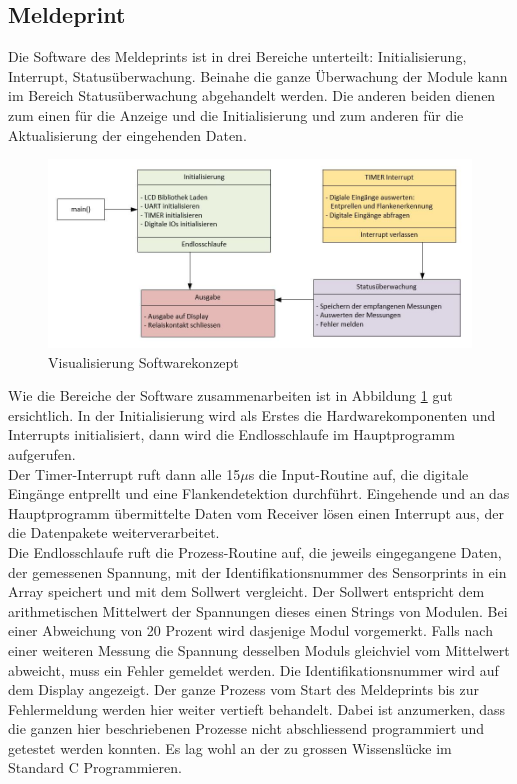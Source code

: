\subsection{Meldeprint}
Die Software des Meldeprints ist in drei Bereiche unterteilt: Initialisierung, Interrupt, Statusüberwachung. Beinahe die ganze Überwachung der Module kann im Bereich Statusüberwachung abgehandelt werden. Die anderen beiden dienen zum einen für die Anzeige und die Initialisierung und zum anderen für die Aktualisierung der eingehenden Daten.

\begin{figure}[htbp] 
  \centering
     \includegraphics[width=1\textwidth]{graphics/reportboard-software-river}
  \caption{Visualisierung Softwarekonzept}
  \label{fig:reportboard-software-river}
\end{figure}

Wie die Bereiche der Software zusammenarbeiten ist in Abbildung \ref{fig:reportboard-software-river} gut ersichtlich. In der Initialisierung wird als Erstes die Hardwarekomponenten und Interrupts initialisiert, dann wird die Endlosschlaufe im Hauptprogramm aufgerufen.\\
Der Timer-Interrupt ruft dann alle 15$\mu$s die Input-Routine auf, die digitale Eingänge entprellt und eine Flankendetektion durchführt. Eingehende und an das Hauptprogramm übermittelte Daten vom Receiver lösen einen Interrupt aus, der die Datenpakete weiterverarbeitet.\\
Die Endlosschlaufe ruft die Prozess-Routine auf, die jeweils eingegangene Daten, der gemessenen Spannung, mit der Identifikationsnummer des Sensorprints in ein Array speichert und mit dem Sollwert vergleicht. Der Sollwert entspricht dem arithmetischen Mittelwert der Spannungen dieses einen Strings von Modulen. Bei einer Abweichung von 20 Prozent wird dasjenige Modul vorgemerkt. Falls nach einer weiteren Messung die Spannung desselben Moduls gleichviel vom Mittelwert abweicht, muss ein Fehler gemeldet werden. Die Identifikationsnummer wird auf dem Display angezeigt. Der ganze Prozess vom Start des Meldeprints bis zur Fehlermeldung werden hier weiter vertieft behandelt. Dabei ist anzumerken, dass die ganzen hier beschriebenen Prozesse nicht abschliessend programmiert und getestet werden konnten. Es lag wohl an der zu grossen Wissenslücke im Standard C Programmieren.


